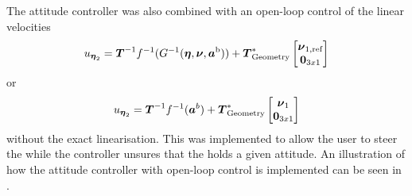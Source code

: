 The attitude controller was also combined with an open-loop control of the linear velocities
\begin{equation}
	u_{\etaVectorAng} = \boldsymbol{T}^{-1}f^{-1}(G^{-1}(\etaVector,\nuVector,\accVector^{\text{b}})) + \thrusterGeometryOnes[*] \begin{bmatrix} \nuVector_{1,\text{ref}} \\ \zeroCol{3} \end{bmatrix}
\end{equation}
or
\begin{equation}
	u_{\etaVectorAng} = \boldsymbol{T}^{-1}f^{-1}(\accVector^b) + \thrusterGeometryOnes[*] \begin{bmatrix} \nuVectorLin \\ \zeroCol{3} \end{bmatrix}
\end{equation}
without the exact linearisation. This was implemented to allow the user to steer the \abbrROV while the controller unsures that the \abbrROV holds a given attitude. An illustration of how the attitude controller with open-loop control is implemented can be seen in .

